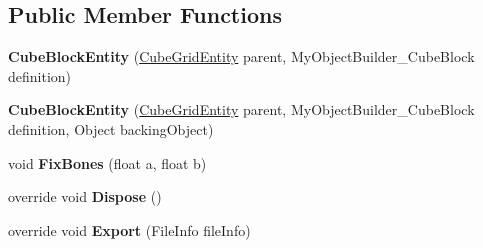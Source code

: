 \subsection*{Public Member Functions}
\begin{DoxyCompactItemize}
\item 
\hypertarget{class_s_e_mod_a_p_i_internal_1_1_a_p_i_1_1_entity_1_1_sector_1_1_sector_object_1_1_cube_grid_1_1_cube_block_entity_a2d67dbd78216274c58207db46443c307}{}{\bfseries Cube\+Block\+Entity} (\hyperlink{class_s_e_mod_a_p_i_internal_1_1_a_p_i_1_1_entity_1_1_sector_1_1_sector_object_1_1_cube_grid_entity}{Cube\+Grid\+Entity} parent, My\+Object\+Builder\+\_\+\+Cube\+Block definition)\label{class_s_e_mod_a_p_i_internal_1_1_a_p_i_1_1_entity_1_1_sector_1_1_sector_object_1_1_cube_grid_1_1_cube_block_entity_a2d67dbd78216274c58207db46443c307}

\item 
\hypertarget{class_s_e_mod_a_p_i_internal_1_1_a_p_i_1_1_entity_1_1_sector_1_1_sector_object_1_1_cube_grid_1_1_cube_block_entity_ab74dcafd04a1b4ecf2ba927292df5226}{}{\bfseries Cube\+Block\+Entity} (\hyperlink{class_s_e_mod_a_p_i_internal_1_1_a_p_i_1_1_entity_1_1_sector_1_1_sector_object_1_1_cube_grid_entity}{Cube\+Grid\+Entity} parent, My\+Object\+Builder\+\_\+\+Cube\+Block definition, Object backing\+Object)\label{class_s_e_mod_a_p_i_internal_1_1_a_p_i_1_1_entity_1_1_sector_1_1_sector_object_1_1_cube_grid_1_1_cube_block_entity_ab74dcafd04a1b4ecf2ba927292df5226}

\item 
\hypertarget{class_s_e_mod_a_p_i_internal_1_1_a_p_i_1_1_entity_1_1_sector_1_1_sector_object_1_1_cube_grid_1_1_cube_block_entity_a6be82e787d7ce9bda5baa16d18807391}{}void {\bfseries Fix\+Bones} (float a, float b)\label{class_s_e_mod_a_p_i_internal_1_1_a_p_i_1_1_entity_1_1_sector_1_1_sector_object_1_1_cube_grid_1_1_cube_block_entity_a6be82e787d7ce9bda5baa16d18807391}

\item 
\hypertarget{class_s_e_mod_a_p_i_internal_1_1_a_p_i_1_1_entity_1_1_sector_1_1_sector_object_1_1_cube_grid_1_1_cube_block_entity_ae9277a72f518931129022098a9058a3f}{}override void {\bfseries Dispose} ()\label{class_s_e_mod_a_p_i_internal_1_1_a_p_i_1_1_entity_1_1_sector_1_1_sector_object_1_1_cube_grid_1_1_cube_block_entity_ae9277a72f518931129022098a9058a3f}

\item 
\hypertarget{class_s_e_mod_a_p_i_internal_1_1_a_p_i_1_1_entity_1_1_sector_1_1_sector_object_1_1_cube_grid_1_1_cube_block_entity_a30edb60eb215a38ce42576818e5b81da}{}override void {\bfseries Export} (File\+Info file\+Info)\label{class_s_e_mod_a_p_i_internal_1_1_a_p_i_1_1_entity_1_1_sector_1_1_sector_object_1_1_cube_grid_1_1_cube_block_entity_a30edb60eb215a38ce42576818e5b81da}


\end{DoxyCompactItemize}
